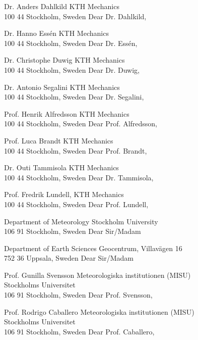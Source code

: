 Dr. Anders Dahlkild
KTH Mechanics\\100 44 Stockholm, Sweden
Dear Dr. Dahlkild,

Dr. Hanno Essén
KTH Mechanics\\100 44 Stockholm, Sweden
Dear Dr. Essén,

Dr. Christophe Duwig
KTH Mechanics\\100 44 Stockholm, Sweden
Dear Dr. Duwig,

Dr. Antonio Segalini
KTH Mechanics\\100 44 Stockholm, Sweden
Dear Dr. Segalini,

Prof. Henrik Alfredsson
KTH Mechanics\\100 44 Stockholm, Sweden
Dear Prof. Alfredsson,

Prof. Luca Brandt
KTH Mechanics\\100 44 Stockholm, Sweden
Dear Prof. Brandt,

Dr. Outi Tammisola
KTH Mechanics\\100 44 Stockholm, Sweden
Dear Dr. Tammisola,

Prof. Fredrik Lundell,
KTH Mechanics\\100 44 Stockholm, Sweden
Dear Prof. Lundell,


%

%

Department of Meteorology
Stockholm University\\106 91 Stockholm, Sweden
Dear Sir/Madam

Department of Earth Sciences
Geocentrum, Villavägen 16\\752 36 Uppsala, Sweden
Dear Sir/Madam

Prof. Gunilla Svensson
Meteorologiska institutionen (MISU)\\Stockholms Universitet\\106 91 Stockholm, Sweden
Dear Prof. Svensson,

Prof. Rodrigo Caballero
Meteorologiska institutionen (MISU)\\Stockholms Universitet\\106 91 Stockholm, Sweden
Dear Prof. Caballero,

